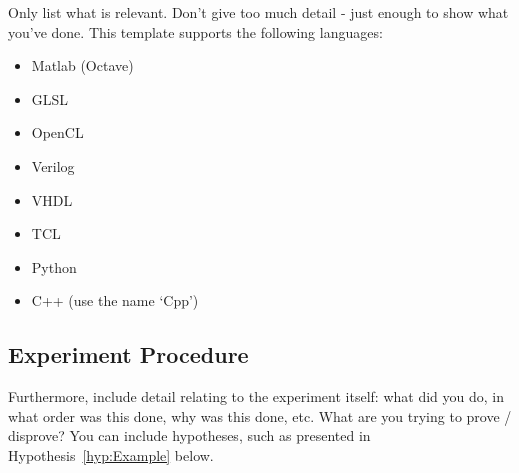 Only list what is relevant.  Don't give too much detail - just enough to show what you've done.  This template supports the following languages:

\begin{itemize}
  \item Matlab (Octave)
  \item GLSL
  \item OpenCL
  \item Verilog
  \item VHDL
  \item TCL
  \item Python
  \item C++ (use the name `Cpp')
\end{itemize}

\subsection{Experiment Procedure}
Furthermore, include detail relating to the experiment itself: what did you do, in what order was this done, why was this done, etc.  What are you trying to prove / disprove?  You can include hypotheses, such as presented in Hypothesis~\ref{hyp:Example} below.


